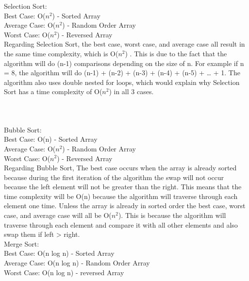 \documentclass[12pt]{article}
\begin{document}
	\noindent Selection Sort:\\
	
	\indent	Best Case: O($n^2$) - Sorted Array\\
	\indent	Average Case: O($n^2$) - Random Order Array\\
	\indent	Worst Case: O($n^2$) - Reversed Array\\
	
	Regarding Selection Sort, the best case, worst case, and average case all result in the same time  complexity, which is O($n^2$) . This is due to the fact that the algorithm will do (n-1) comparisons depending on the size of n. For example if n = 8, the algorithm will do (n-1) + (n-2) + (n-3) + (n-4) + (n-5) + … + 1. The algorithm also uses double nested for loops, which would explain why Selection Sort has a time complexity of O($n^2$) in all 3 cases.\\
	\\
	\\
	\\
	
	\noindent Bubble Sort:\\
	
	\indent Best Case: O(n) - Sorted Array\\
	\indent	Average Case: O($n^2$) - Random Order Array\\
	\indent	Worst Case: O($n^2$) - Reversed Array\\
	
	Regarding Bubble Sort, The best case occurs when the array is already sorted because during the first iteration of the algorithm the swap will not occur because the left element will not be greater than the right. This means that the time complexity will be O(n) because the algorithm will traverse through each element one time. Unless the array is already in sorted order the best case, worst  case, and average case will all be O($n^2$). This is because the algorithm will traverse through each element and compare it with all other elements and also swap them if left > right.\\
	
	\noindent Merge Sort:\\
	
	\indent Best Case: O(n log n) - Sorted Array\\
	\indent Average Case: O(n log n) - Random Order Array\\
	\indent Worst Case: O(n log n) - reversed Array\\
	
\end{document}

